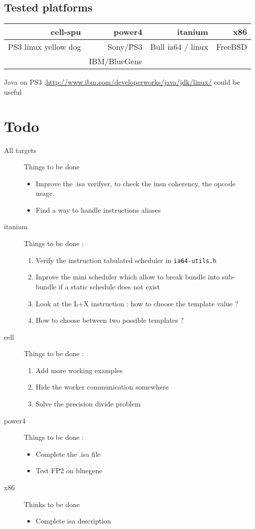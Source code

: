 \documentclass{article}
\begin{document}
\subsection{Tested platforms}

\begin{tabular}{|r|r|r|r|} \hline
  cell-spu 		& power4       & itanium           & x86\\ \hline
  PS3 linux yellow dog  & Sony/PS3     & Bull ia64 / linux & FreeBSD \\
                        & IBM/BlueGene &	           \\ \hline
\end{tabular}

Java on PS3 :\url{http://www.ibm.com/developerworks/java/jdk/linux/} could be useful

\section{Todo}

\begin{description}
\item[All targets] Things to be done
  \begin{itemize}
  \item Improve the .isa verifyer, to check the insn coherency, the opcode
    usage.
  \item Find a way to handle instructions aliases
  \end{itemize}
\item[itanium] Things to be done :
  \begin{enumerate}
  \item Verify the instruction tabulated scheduler in \texttt{ia64-utils.h}
  \item Inprove the mini scheduler which allow to break bundle into
    sub-bundle if a static schedule does not exist
  \item Look at the L+X instruction : how to choose the template value ?
  \item How to choose between two possible templates ?
  \end{enumerate}
\item[cell] Things to be done :
  \begin{enumerate}
  \item Add more working examples
  \item Hide the worker communication somewhere
  \item Solve the precision divide problem
  \end{enumerate}
\item[power4]  Things to be done :
  \begin{itemize}
  \item Complete the .isa file
  \item Test  FP2 on bluegene
  \end{itemize}
\item[x86]  Thinks to be done
  \begin{itemize}
  \item Complete isa description
  \end{itemize}

\end{description}
\end{document}
